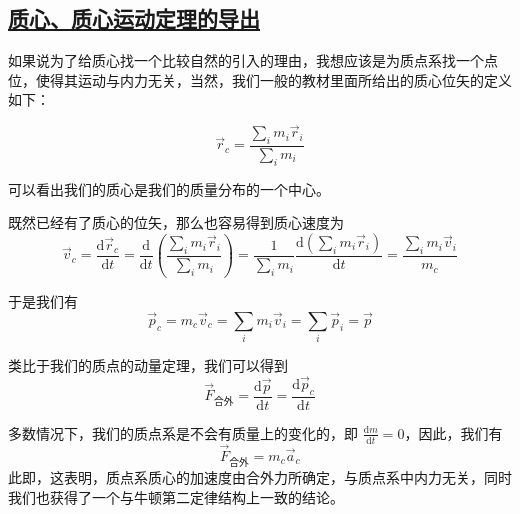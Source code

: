 \subsection{\protect\hyperlink{:}{质心、质心运动定理的导出}}

如果说为了给质心找一个比较自然的引入的理由，我想应该是为质点系找一个点位，使得其运动与内力无关，当然，我们一般的教材里面所给出的质心位矢的定义如下：
\begin{definition}
    \begin{equation}
        \vec{r}_c = \dfrac{\sum_i m_i \vec{r}_i}{\sum_i m_i}
    \end{equation}
\end{definition}
可以看出我们的质心是我们的质量分布的一个中心。

既然已经有了质心的位矢，那么也容易得到质心速度为
\begin{equation}
    \vec{v}_c = \frac{\mathrm{d} \vec{r}_c}{\mathrm{d} t} = \frac{\mathrm{d}}{\mathrm{d} t}\left(\frac{\sum_i m_i \vec{r}_i}{\sum_i m_i}\right) = \frac{1}{\sum_i m_i}\frac{\mathrm{d} (\sum_i m_i \vec{r}_i)}{\mathrm{d} t} = \frac{\sum_i m_i \vec{v}_i}{m_c}
\end{equation}

于是我们有
\begin{equation}
    \vec{p}_c = m_c \vec{v}_c = \sum_i m_i \vec{v}_i = \sum_i \vec{p}_i = \vec{p}
\end{equation}

类比于我们的质点的动量定理，我们可以得到
\begin{equation}
    \vec{F}_{\text{合外}} = \frac{\mathrm{d}\vec{p}}{\mathrm{d}t} = \frac{\mathrm{d}\vec{p}_c}{\mathrm{d}t}
\end{equation}

多数情况下，我们的质点系是不会有质量上的变化的，即 $\displaystyle \frac{\mathrm{d} m}{\mathrm{d} t} = 0$，因此，我们有 
\begin{equation}
    \vec{F}_{\text{合外}} = m_c \vec{a}_c
\end{equation}
此即，这表明，质点系质心的加速度由合外力所确定，与质点系中内力无关，同时我们也获得了一个与牛顿第二定律结构上一致的结论。\\


